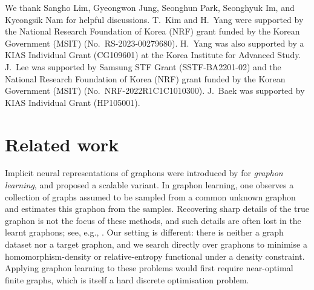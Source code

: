 \documentclass{article}
\theoremstyle{plain}
\theoremstyle{definition}
\theoremstyle{remark}
\begin{document}
\begin{ack}
We thank Sangho Lim, Gyeongwon Jung, Seonghun Park, Seonghyuk Im, and Kyeongsik Nam for helpful discussions.
T.~Kim and H.~Yang were supported by the National Research Foundation of Korea (NRF) grant funded by the Korean Government (MSIT) (No.~RS-2023-00279680). H.~Yang was also supported by a KIAS Individual Grant (CG109601) at the Korea Institute for Advanced Study. J.~Lee was supported by Samsung STF Grant (SSTF-BA2201-02) and the National Research Foundation of Korea (NRF) grant funded by the Korean Government (MSIT) (No.~NRF-2022R1C1C1010300).
J.~Baek was supported by KIAS Individual Grant (HP105001).
\end{ack}




\appendix

\newpage

\allowdisplaybreaks[0]

\section{Related work}

Implicit neural representations of graphons were introduced by \citet{xia2023implicit} for \emph{graphon learning}, and \citet{azizpour2025scalable} proposed a scalable variant. In graphon learning, one observes a collection of graphs assumed to be sampled from a common unknown graphon and estimates this graphon from the samples. Recovering sharp details of the true graphon is not the focus of these methods, and such details are often lost in the learnt graphons; see, e.g., \citet[Figs.~3(b) and~9]{azizpour2025scalable}. Our setting is different: there is neither a graph dataset nor a target graphon, and we search directly over graphons to minimise a homomorphism-density or relative-entropy functional under a density constraint. Applying graphon learning to these problems would first require near-optimal finite graphs, which is itself a hard discrete optimisation problem.
\end{document}
